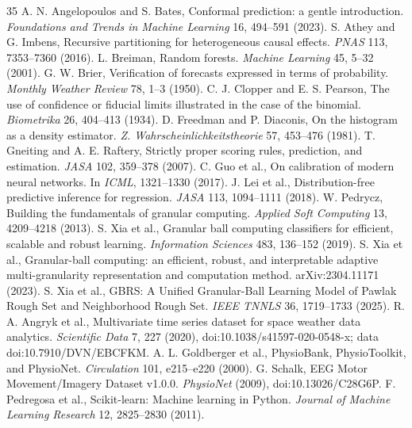 \documentclass[10pt]{article}
\begin{document}
\begin{thebibliography}{35}\tiny
{} A. N. Angelopoulos and S. Bates, Conformal prediction: a gentle introduction. \emph{Foundations and Trends in Machine Learning} 16, 494--591 (2023).
 S. Athey and G. Imbens, Recursive partitioning for heterogeneous causal effects. \emph{PNAS} 113, 7353--7360 (2016).
 L. Breiman, Random forests. \emph{Machine Learning} 45, 5--32 (2001).
 G. W. Brier, Verification of forecasts expressed in terms of probability. \emph{Monthly Weather Review} 78, 1--3 (1950).
 C. J. Clopper and E. S. Pearson, The use of confidence or fiducial limits illustrated in the case of the binomial. \emph{Biometrika} 26, 404--413 (1934).
 D. Freedman and P. Diaconis, On the histogram as a density estimator. \emph{Z. Wahrscheinlichkeitstheorie} 57, 453--476 (1981).
 T. Gneiting and A. E. Raftery, Strictly proper scoring rules, prediction, and estimation. \emph{JASA} 102, 359--378 (2007).
 C. Guo et al., On calibration of modern neural networks. In \emph{ICML}, 1321--1330 (2017).
 J. Lei et al., Distribution-free predictive inference for regression. \emph{JASA} 113, 1094--1111 (2018).
 W. Pedrycz, Building the fundamentals of granular computing. \emph{Applied Soft Computing} 13, 4209--4218 (2013).
 S. Xia et al., Granular ball computing classifiers for efficient, scalable and robust learning. \emph{Information Sciences} 483, 136--152 (2019).
 S. Xia et al., Granular-ball computing: an efficient, robust, and interpretable adaptive multi-granularity representation and computation method. arXiv:2304.11171 (2023).
 S. Xia et al., GBRS: A Unified Granular-Ball Learning Model of Pawlak Rough Set and Neighborhood Rough Set. \emph{IEEE TNNLS} 36, 1719--1733 (2025).
 R. A. Angryk et al., Multivariate time series dataset for space weather data analytics. \emph{Scientific Data} 7, 227 (2020), doi:10.1038/s41597-020-0548-x; data doi:10.7910/DVN/EBCFKM.
 A. L. Goldberger et al., PhysioBank, PhysioToolkit, and PhysioNet. \emph{Circulation} 101, e215--e220 (2000).
 G. Schalk, EEG Motor Movement/Imagery Dataset v1.0.0. \emph{PhysioNet} (2009), doi:10.13026/C28G6P.
 F. Pedregosa et al., Scikit-learn: Machine learning in Python. \emph{Journal of Machine Learning Research} 12, 2825--2830 (2011).

\end{thebibliography}
\end{document}
